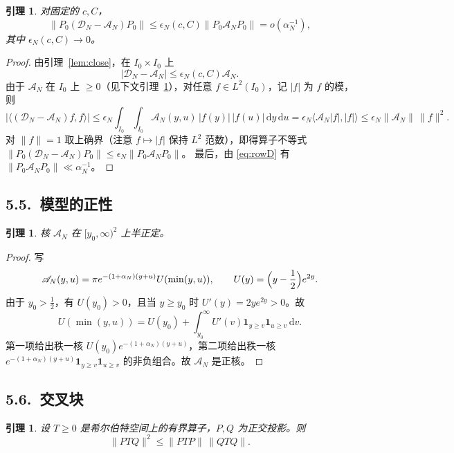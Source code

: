 \documentclass[12pt,a4paper]{amsart}
\numberwithin{equation}{section}
\theoremstyle{plain}
\newtheorem{lemma}[theorem]{引理}
\theoremstyle{definition}
\newcommand{\dd}{\,\mathrm{d}}
\begin{document}
\begin{lemma}\label{lem:center}
对固定的 $c,C$，
\begin{equation}\label{eq:center}
 \|P_0(\mathcal D_N-\mathscr A_N)P_0\|\le\epsilon_N(c,C)\|P_0\mathscr A_NP_0\|
 =o(\alpha_N^{-1}),
\end{equation}
其中 $\epsilon_N(c,C)\to0$。
\end{lemma}

\begin{proof}
由引理~\ref{lem:close}，在 $I_0\times I_0$ 上
\[
 |\mathscr D_N-\mathscr A_N|\le\epsilon_N(c,C)\mathscr A_N .
\]
由于 $\mathscr A_N$ 在 $I_0$ 上 $\ge0$（见下文引理~\ref{lem:positive}），对任意
$f\in L^2(I_0)$，记 $|f|$ 为 $f$ 的模，则
\[
 \bigl|\langle(\mathcal D_N-\mathscr A_N)f,f\rangle\bigr|
 \le\epsilon_N\int_{I_0}\!\int_{I_0}\mathscr A_N(y,u)\,|f(y)|\,|f(u)|\dd y\dd u
 =\epsilon_N\langle\mathscr A_N|f|,|f|\rangle
 \le\epsilon_N\|\mathscr A_N\|\,\|f\|^2 .
\]
对 $\|f\|=1$ 取上确界（注意 $f\mapsto|f|$ 保持 $L^2$ 范数），即得算子不等式
$\|P_0(\mathcal D_N-\mathscr A_N)P_0\|\le\epsilon_N\|P_0\mathscr A_NP_0\|$。
最后，由 \eqref{eq:rowD} 有 $\|P_0\mathscr A_NP_0\|\ll\alpha_N^{-1}$。
\end{proof}

\subsection*{5.5.\ 模型的正性}

\begin{lemma}\label{lem:positive}
核 $\mathscr A_N$ 在 $[y_0,\infty)^2$ 上半正定。
\end{lemma}

\begin{proof}
写
\[
 \mathscr A_N(y,u)=\pi e^{-(1+\alpha_N)(y+u)}U(\min(y,u)),
 \qquad U(y)=\Bigl(y-\frac12\Bigr)e^{2y}.
\]
由于 $y_0>\frac12$，有 $U(y_0)>0$，且当 $y\ge y_0$ 时 $U'(y)=2ye^{2y}>0$。故
\[
 U(\min(y,u))=U(y_0)+\int_{y_0}^{\infty}U'(v)\mathbf 1_{y\ge v}\mathbf 1_{u\ge v}\dd v .
\]
第一项给出秩一核 $U(y_0)e^{-(1+\alpha_N)(y+u)}$，第二项给出秩一核
$e^{-(1+\alpha_N)(y+u)}\mathbf 1_{y\ge v}\mathbf 1_{u\ge v}$ 的非负组合。故
$\mathscr A_N$ 是正核。
\end{proof}

\subsection*{5.6.\ 交叉块}

\begin{lemma}\label{lem:cross}
设 $T\ge0$ 是希尔伯特空间上的有界算子，$P,Q$ 为正交投影。则
\begin{equation}\label{eq:cross}
 \|PTQ\|^2\le\|PTP\|\,\|QTQ\| .
\end{equation}
\end{lemma}
\end{document}

